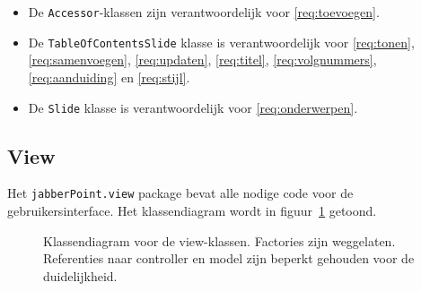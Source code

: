 \documentclass[a4paper]{article}
\newcommand{\reqref}[1]{\ref{req:#1}}
\newcommand{\code}[1]{\lstinline[columns=fixed]{#1}}
\begin{document}
        \begin{itemize}
            \item De \code{Accessor}-klassen zijn verantwoordelijk voor \reqref{toevoegen}.
            \item De \code{TableOfContentsSlide} klasse is verantwoordelijk voor \reqref{tonen}, \reqref{samenvoegen},
                \reqref{updaten}, \reqref{titel}, \reqref{volgnummers}, \reqref{aanduiding} en \reqref{stijl}.
            \item De \code{Slide} klasse is verantwoordelijk voor \reqref{onderwerpen}.
        \end{itemize}

	\subsection{View}
		Het \code{jabberPoint.view} package bevat alle nodige code voor de gebruikersinterface.
		Het klassendiagram wordt in figuur~\ref{fig:view} getoond.

		\begin{figure}[!htb]
		 \caption{
			Klassendiagram voor de view-klassen.\label{fig:view}
			Factories zijn weggelaten.
			Referenties naar controller en model zijn beperkt gehouden voor de duidelijkheid.
		 }
		\end{figure}
\end{document}
